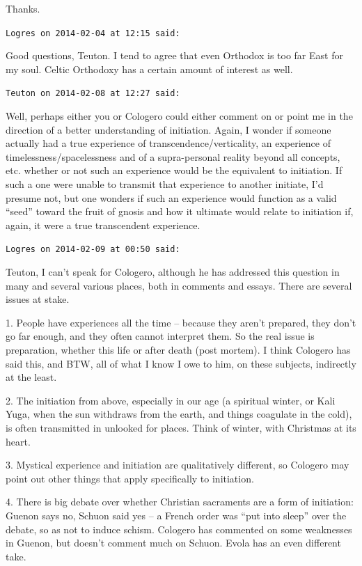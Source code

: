 \begin{footnotesize}
\begin{sffamily}
Thanks.

\hfill

\texttt{Logres on 2014-02-04 at 12:15 said:}

Good questions, Teuton. I tend to agree that even Orthodox is too far East for my soul. Celtic Orthodoxy has a certain amount of interest as well.

\hfill

\texttt{Teuton on 2014-02-08 at 12:27 said:}

Well, perhaps either you or Cologero could either comment on or point me in the direction of a better understanding of initiation. Again, I wonder if someone actually had a true experience of transcendence/verticality, an experience of timelessness/spacelessness and of a supra-personal reality beyond all concepts, etc. whether or not such an experience would be the equivalent to initiation. If such a one were unable to transmit that experience to another initiate, I'd presume not, but one wonders if such an experience would function as a valid ``seed'' toward the fruit of gnosis and how it ultimate would relate to initiation if, again, it were a true transcendent experience.

\hfill

\texttt{Logres on 2014-02-09 at 00:50 said:}

Teuton, I can't speak for Cologero, although he has addressed this question in many and several various places, both in comments and essays. There are several issues at stake.

1. People have experiences all the time -- because they aren't prepared, they don't go far enough, and they often cannot interpret them. So the real issue is preparation, whether this life or after death (post mortem). I think Cologero has said this, and BTW, all of what I know I owe to him, on these subjects, indirectly at the least.

2. The initiation from above, especially in our age (a spiritual winter, or Kali Yuga, when the sun withdraws from the earth, and things coagulate in the cold), is often transmitted in unlooked for places. Think of winter, with Christmas at its heart.

3. Mystical experience and initiation are qualitatively different, so Cologero may point out other things that apply specifically to initiation.

4. There is big debate over whether Christian sacraments are a form of initiation: Guenon says no, Schuon said yes -- a French order was ``put into sleep'' over the debate, so as not to induce schism. Cologero has commented on some weaknesses in Guenon, but doesn't comment much on Schuon. Evola has an even different take.


\end{sffamily}
\end{footnotesize}
